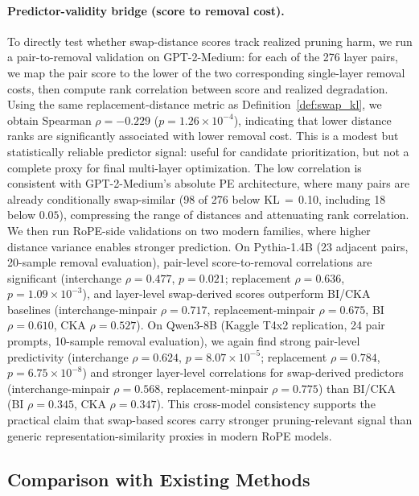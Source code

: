 \documentclass{article}
\begin{document}
\paragraph{Predictor-validity bridge (score to removal cost).}
To directly test whether swap-distance scores track realized pruning harm, we run a pair-to-removal validation on GPT-2-Medium: for each of the 276 layer pairs, we map the pair score to the lower of the two corresponding single-layer removal costs, then compute rank correlation between score and realized degradation. Using the same replacement-distance metric as Definition~\ref{def:swap_kl}, we obtain Spearman $\rho{=}-0.229$ ($p{=}1.26\times 10^{-4}$), indicating that lower distance ranks are significantly associated with lower removal cost. This is a modest but statistically reliable predictor signal: useful for candidate prioritization, but not a complete proxy for final multi-layer optimization. The low correlation is consistent with GPT-2-Medium's absolute PE architecture, where many pairs are already conditionally swap-similar (98 of 276 below KL\,$=$\,0.10, including 18 below $0.05$), compressing the range of distances and attenuating rank correlation. We then run RoPE-side validations on two modern families, where higher distance variance enables stronger prediction. On Pythia-1.4B (23 adjacent pairs, 20-sample removal evaluation), pair-level score-to-removal correlations are significant (interchange $\rho{=}0.477$, $p{=}0.021$; replacement $\rho{=}0.636$, $p{=}1.09\times10^{-3}$), and layer-level swap-derived scores outperform BI/CKA baselines (interchange-minpair $\rho{=}0.717$, replacement-minpair $\rho{=}0.675$, BI $\rho{=}0.610$, CKA $\rho{=}0.527$). On Qwen3-8B (Kaggle T4x2 replication, 24 pair prompts, 10-sample removal evaluation), we again find strong pair-level predictivity (interchange $\rho{=}0.624$, $p{=}8.07\times10^{-5}$; replacement $\rho{=}0.784$, $p{=}6.75\times10^{-8}$) and stronger layer-level correlations for swap-derived predictors (interchange-minpair $\rho{=}0.568$, replacement-minpair $\rho{=}0.775$) than BI/CKA (BI $\rho{=}0.345$, CKA $\rho{=}0.347$). This cross-model consistency supports the practical claim that swap-based scores carry stronger pruning-relevant signal than generic representation-similarity proxies in modern RoPE models.
\subsection{Comparison with Existing Methods}
\label{sec:exp_laco_sleb}
\end{document}
